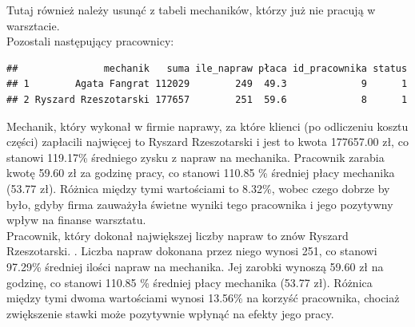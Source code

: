 \documentclass{article}\usepackage[]{graphicx}\usepackage[]{xcolor}
\makeatletter
\newenvironment{kframe}{%
 \def\at@end@of@kframe{}%
 \ifinner\ifhmode%
  \def\at@end@of@kframe{\end{minipage}}%
  \begin{minipage}{\columnwidth}%
 \fi\fi%
 \def\FrameCommand##1{\hskip\@totalleftmargin \hskip-\fboxsep
 \colorbox{shadecolor}{##1}\hskip-\fboxsep
     \hskip-\linewidth \hskip-\@totalleftmargin \hskip\columnwidth}%
 \MakeFramed {\advance\hsize-\width
   \@totalleftmargin\z@ \linewidth\hsize
   \@setminipage}}%
 {\par\unskip\endMakeFramed%
 \at@end@of@kframe}
\newenvironment{knitrout}{}{} %
\makeatother
\begin{document}
Tutaj również należy usunąć z tabeli mechaników, którzy już nie pracują w warsztacie. \\

Pozostali następujący pracownicy:

\begin{knitrout}
\color{fgcolor}\begin{kframe}
\begin{verbatim}
##               mechanik   suma ile_napraw płaca id_pracownika status
## 1        Agata Fangrat 112029        249  49.3             9      1
## 2 Ryszard Rzeszotarski 177657        251  59.6             8      1
\end{verbatim}
\end{kframe}
\end{knitrout}

Mechanik, który wykonał w firmie naprawy, za które klienci (po odliczeniu kosztu części) zapłacili najwięcej to Ryszard Rzeszotarski i jest to kwota 177657.00 zł, co stanowi 119.17\% średniego zysku z napraw na mechanika. Pracownik zarabia kwotę 59.60 zł za godzinę pracy, co stanowi 110.85 \% średniej płacy mechanika (53.77 zł). Różnica między tymi wartościami to 8.32\%, wobec czego dobrze by było, gdyby firma zauważyła świetne wyniki tego pracownika i jego pozytywny wpływ na finanse warsztatu. \\

Pracownik, który dokonał największej liczby napraw to znów Ryszard Rzeszotarski. . Liczba napraw dokonana przez niego wynosi 251, co stanowi 97.29\% średniej ilości napraw na mechanika. Jej zarobki wynoszą 59.60 zł na godzinę, co stanowi 110.85 \% średniej płacy mechanika (53.77 zł). Różnica między tymi dwoma wartościami wynosi 13.56\% na korzyść pracownika, chociaż zwiększenie stawki może pozytywnie wpłynąć na efekty jego pracy.
\end{document}
